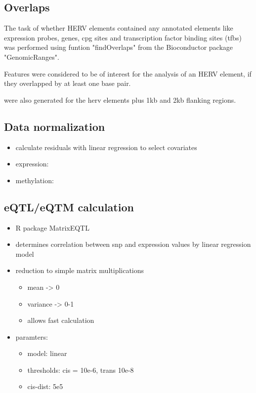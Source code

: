 \documentclass[a4paper,12pt]{article}
\begin{document}
\subsection{Overlaps}
The task of whether HERV elements contained any annotated elements like expression probes, genes, cpg sites and transcription factor binding sites (tfbs) was performed using funtion "findOverlaps" from the Bioconductor package "GenomicRanges"\cite{10.1371/journal.pcbi.1003118}. 

Features were considered to be of interest for the analysis of an HERV element, if they overlapped by at least one base pair.

 were also generated for the herv elements plus 1kb and 2kb flanking regions. 

\subsection{Data normalization}


\begin{itemize}
\item calculate residuals with linear regression to select covariates
\item expression: 
\item methylation:
\end{itemize}
\subsection{eQTL/eQTM calculation}
\begin{itemize}
\item R package MatrixEQTL
\item determines correlation between snp and expression values by linear regression model
\item reduction to simple matrix multiplications
\begin{itemize}
\item mean -> 0
\item variance -> 0-1
\item allows fast calculation
\end{itemize}
\item paramters: 
\begin{itemize}
\item model: linear
\item thresholds: cis = 10e-6, trans 10e-8
\item cis-dist: 5e5
\end{itemize}
\end{itemize}
\end{document}
